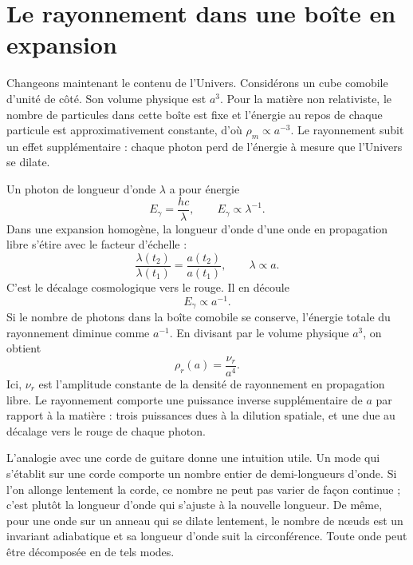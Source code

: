 \section{Le rayonnement dans une boîte en expansion}

Changeons maintenant le contenu de l’Univers. Considérons un cube comobile d’unité de côté. Son volume physique est \(a^3\). Pour la matière non relativiste, le nombre de particules dans cette boîte est fixe et l’énergie au repos de chaque particule est approximativement constante, d’où \(\rho_m\propto a^{-3}\). Le rayonnement subit un effet supplémentaire : chaque photon perd de l’énergie à mesure que l’Univers se dilate.

Un photon de longueur d’onde \(\lambda\) a pour énergie
\begin{equation}
E_\gamma=\frac{hc}{\lambda},
\qquad
E_\gamma\propto\lambda^{-1}.
\label{eq:c02-photon-energy}
\end{equation}
Dans une expansion homogène, la longueur d’onde d’une onde en propagation libre s’étire avec le facteur d’échelle :
\begin{equation}
\frac{\lambda(t_2)}{\lambda(t_1)}
=\frac{a(t_2)}{a(t_1)},
\qquad
\lambda\propto a.
\label{eq:c02-redshift}
\end{equation}
C’est le décalage cosmologique vers le rouge. Il en découle
\begin{equation}
E_\gamma\propto a^{-1}.
\label{eq:c02-photon-redshift}
\end{equation}
Si le nombre de photons dans la boîte comobile se conserve, l’énergie totale du rayonnement diminue comme \(a^{-1}\). En divisant par le volume physique \(a^3\), on obtient
\begin{equation}
\boxed{\rho_r(a)=\frac{\nu_r}{a^4}.}
\label{eq:c02-radiation-density}
\end{equation}
Ici, \(\nu_r\) est l’amplitude constante de la densité de rayonnement en propagation libre. Le rayonnement comporte une puissance inverse supplémentaire de \(a\) par rapport à la matière : trois puissances dues à la dilution spatiale, et une due au décalage vers le rouge de chaque photon.

L’analogie avec une corde de guitare donne une intuition utile. Un mode qui s’établit sur une corde comporte un nombre entier de demi-longueurs d’onde. Si l’on allonge lentement la corde, ce nombre ne peut pas varier de façon continue ; c’est plutôt la longueur d’onde qui s’ajuste à la nouvelle longueur. De même, pour une onde sur un anneau qui se dilate lentement, le nombre de nœuds est un invariant adiabatique et sa longueur d’onde suit la circonférence. Toute onde peut être décomposée en de tels modes.

